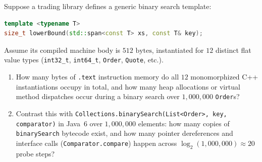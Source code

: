 \begin{exercise}
Suppose a trading library defines a generic binary search template:
\begin{lstlisting}[language=C++]
template <typename T>
size_t lowerBound(std::span<const T> xs, const T& key);
\end{lstlisting}
Assume its compiled machine body is $512\text{ bytes}$, instantiated for $12$ distinct flat value types (\texttt{int32\_t}, \texttt{int64\_t}, \texttt{Order}, \texttt{Quote}, etc.).
\begin{enumerate}[label=(\alph*)]
  \item How many bytes of \texttt{.text} instruction memory do all $12$ monomorphized C++ instantiations occupy in total, and how many heap allocations or virtual method dispatches occur during a binary search over $1{,}000{,}000$ \texttt{Order}s?
  \item Contrast this with \texttt{Collections.binarySearch(List<Order>, key, comparator)} in Java~6 over $1{,}000{,}000$ elements: how many copies of \texttt{binarySearch} bytecode exist, and how many pointer dereferences and interface calls (\texttt{Comparator.compare}) happen across $\log_2(1{,}000{,}000) \approx 20$ probe steps?
\end{enumerate}
\end{exercise}

\chapterline
